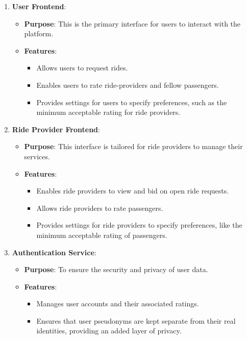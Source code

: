 \begin{enumerate}
    \item \textbf{User Frontend}:
    \begin{itemize}
        \item \textbf{Purpose}: This is the primary interface for users to interact with the platform.
        \item \textbf{Features}:
        \begin{itemize}
            \item Allows users to request rides.
            \item Enables users to rate ride-providers and fellow passengers.
            \item Provides settings for users to specify preferences, such as the minimum acceptable rating for ride providers.
        \end{itemize}
    \end{itemize}

    \item \textbf{Ride Provider Frontend}:
    \begin{itemize}
        \item \textbf{Purpose}: This interface is tailored for ride providers to manage their services.
        \item \textbf{Features}:
        \begin{itemize}
            \item Enables ride providers to view and bid on open ride requests.
            \item Allows ride providers to rate passengers.
            \item Provides settings for ride providers to specify preferences, like the minimum acceptable rating of passengers.
        \end{itemize}
    \end{itemize}

    \item \textbf{Authentication Service}:
    \begin{itemize}
        \item \textbf{Purpose}: To ensure the security and privacy of user data.
        \item \textbf{Features}:
        \begin{itemize}
            \item Manages user accounts and their associated ratings.
            \item Ensures that user pseudonyms are kept separate from their real identities, providing an added layer of privacy.
        \end{itemize}
    \end{itemize}


\end{enumerate}
